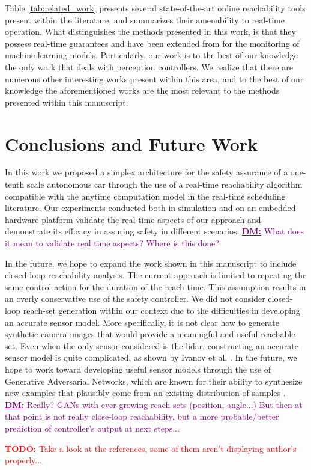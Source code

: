 \documentclass[manuscript,screen,review]{acmart}
\newcommand{\todo}[1]{\textcolor{red}{\textbf{\underline{TODO:}} #1}}
\newcommand{\diego}[1]{\textcolor{purple}{\textbf{\underline{DM:}} #1}}
\begin{document}
Table \ref{tab:related_work} presents several state-of-the-art online reachability tools present within the literature, and summarizes their amenability to real-time operation. What distinguishes the methods presented in this work, is that they possess real-time guarantees and have been extended from \cite{Johnson2016} for the monitoring of machine learning models. Particularly, our work is to the best of our knowledge the only work that deals with perception controllers. We realize that there are numerous other interesting works present within this area, and to the best of our knowledge the aforementioned works are the most relevant to the methods presented within this manuscript.   

\section{Conclusions and Future Work}

In this work we proposed a simplex architecture for the safety assurance of a one-tenth scale autonomous car through the use of a real-time reachability algorithm compatible with the anytime computation model in the real-time scheduling literature. Our experiments conducted both in simulation and on an embedded hardware platform validate the real-time aspects of our approach and demonstrate its efficacy in assuring safety in different scenarios. \diego{What does it mean to validate real time aspects? Where is this done?}

In the future, we hope to expand the work shown in this manuscript to include closed-loop reachability analysis. The current approach is limited to repeating the same control action for the duration of the reach time. This assumption results in an overly conservative use of the safety controller. %
We did not consider closed-loop reach-set generation within our context due to the difficulties in developing an accurate sensor model. More specifically, it is not clear how to generate synthetic camera images that would provide a meaningful and useful reachable set. Even when the only sensor considered is the lidar, constructing an accurate sensor model is quite complicated, as shown by Ivanov et al. \cite{ivanov2020case}. In the future, we hope to work toward developing useful sensor models through the use of Generative Adversarial Networks, which are known for their ability to synthesize new examples that plausibly come from an existing distribution of samples \cite{Radford2016,Brock2018,goodfellow2014}. \diego{Really? GANs with ever-growing reach sets (position, angle...) But then at that point is not really close-loop reachability, but a more probable/better prediction of controller's output at next steps...}

\todo{Take a look at the references, some of them aren't displaying author's properly...}





\appendix
\end{document}
